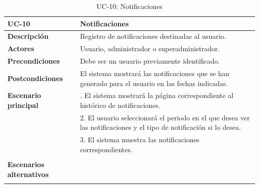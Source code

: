\begin{table}[H]
  \begin{center}
    \begin{tabularx}{16.4cm}{|l|X|}
      \hline
      \textbf{UC-10} & \textbf{Notificaciones}\\
      \hline
      \textbf{Descripción} & Registro de notificaciones destinadas al usuario.\\
      \hline
      \textbf{Actores} & Usuario, administrador o superadministrador.\\
      \hline
      \textbf{Precondiciones} & Debe ser un usuario previamente identificado.\\
      \hline
      \textbf{Postcondiciones} & El sistema mostrará las notificaciones que se han generado para el usuario en las fechas indicadas.\\
      \hline
      \textbf{Escenario principal} & \smallskip 1. El sistema mostrará la página correspondiente al histórico de notificaciones.\\
      & 2. El usuario seleccionará el periodo en el que desea ver las notificaciones y el tipo de notificación si lo desea.\\
      & 3. El sistema muestra las notificaciones correspondientes.\\
      & \\
      \hline
      \textbf{Escenarios alternativos} & \\
      & \\
      \hline
    \end{tabularx}
    \caption{UC-10: Notificaciones}
    \label{tab:CU-notificaciones}
  \end{center}
\end{table}


